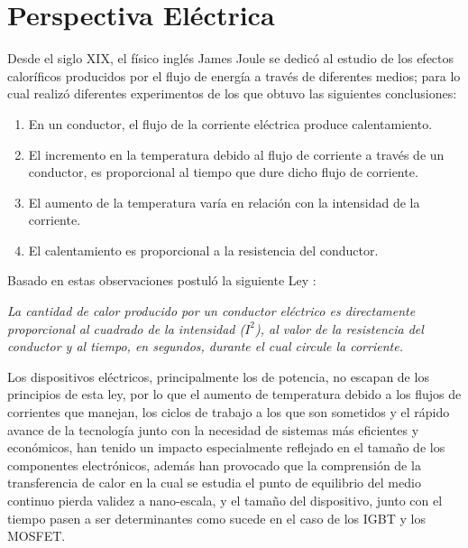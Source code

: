 \section{Perspectiva Eléctrica}

Desde el siglo XIX, el físico inglés James Joule se dedicó al estudio de los efectos caloríficos producidos por el flujo de energía a través de diferentes medios; para lo cual realizó diferentes experimentos de los que obtuvo las siguientes conclusiones: \cite{joule}

\begin{enumerate}
    \item En un conductor, el flujo de la corriente eléctrica produce calentamiento.
    \item El incremento en la temperatura debido al flujo de corriente a través de un conductor, es proporcional al tiempo que dure dicho flujo de corriente.
    \item El aumento de la temperatura varía en relación con la intensidad de la corriente.
    \item El calentamiento es proporcional a la resistencia del conductor.
\end{enumerate}

Basado en estas observaciones postuló la siguiente Ley \cite{joule}:

\begin{center}

\centering
\textit{ La cantidad de calor producido por un conductor eléctrico es directamente proporcional al cuadrado de la intensidad ($I^2$), al valor de la resistencia del conductor y al tiempo, en segundos, durante el cual circule la corriente.}

\end{center}

Los dispositivos eléctricos, principalmente los de potencia, no escapan de los principios de esta ley, por lo que el aumento de temperatura debido a los flujos de corrientes que manejan, los ciclos de trabajo a los que son sometidos y el rápido avance de la tecnología junto con la necesidad de sistemas más eficientes y económicos, han tenido un impacto especialmente reflejado en el tamaño de los componentes electrónicos, además han provocado que la comprensión de la transferencia de calor en la cual se estudia el punto de equilibrio del medio continuo pierda validez a nano-escala, y el tamaño del dispositivo, junto con el tiempo pasen a ser determinantes como sucede en el caso de los IGBT y los MOSFET. \cite{cengel} 

